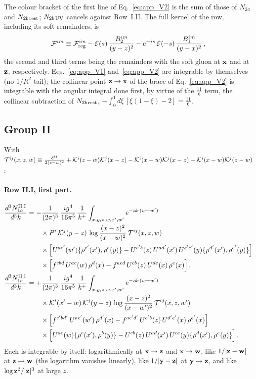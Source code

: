 The colour bracket of the first line of Eq.~\eqref{eq:app_V2} is the sum of those of $N_{2a}$ and $N_{2b\,\rm rest}$; $N_{2b\,\rm UV}$ cancels against Row~I.II. The full kernel of the row, including its soft remainders, is
\begin{align}\label{eq:app_F}
\mathcal F^{im}\equiv\mathcal F^{im}_{\rm reg}-\mathcal E(s)\,\frac{B_2^{im}}{(y-z)^2}-e^{-is}\,\mathcal E(-s)\,\frac{B_1^{im}}{(y-x)^2}\,,
\end{align}
the second and third terms being the remainders with the soft gluon at $\mathbf{x}$ and at $\mathbf{z}$, respectively. Eqs.~\eqref{eq:app_V1} and~\eqref{eq:app_V2} are integrable by themselves (no $1/R^2$ tail); the collinear point $\mathbf{z}\to\mathbf{x}$ of the brace of Eq.~\eqref{eq:app_V2} is integrable with the angular integral done first, by virtue of the $\frac{11}{6}$ term, the collinear subtraction of $N_{2b\,\rm rest}$, $-\int_0^1d\xi\,[\xi(1-\xi)-2]=\frac{11}{6}$.

\subsection{Group II}

With $\mathcal T^{ij}(x,z,w)\equiv\frac{\delta^{ij}}{2(z-w)^2}+\mathcal{K}^i(z-w)\mathcal{K}^j(x-z)-\mathcal{K}^i(x-w)\mathcal{K}^j(x-z)-\mathcal{K}^i(x-w)\mathcal{K}^j(z-w)$:

\paragraph{Row II.I, first part.}
\begin{align}\label{eq:app_III1a}
\frac{d^3N^{\rm II.I}_{1a}}{d^3k}&=-\frac{1}{(2\pi)^3}\,\frac{ig^4}{16\pi^5}\,\frac{1}{k^+}\int_{x,y,z,w,x',w'}e^{-ik\cdot(w-w')}\notag\\&\qquad\times P^i\,\mathcal{K}^j(y-z)\,\log\frac{(x-z)^2}{(x-w)^2}\,\mathcal T^{ij}(x,z,w)\notag\\
&\qquad\times\Big[U^{ac'}(w')\{\rho^{c'}(x'),\rho^b(y)\}-U^{c'b}(z)\,U^{ad'}(x')\,U^{c'e'}(y)\{\rho^{d'}(x'),\rho^{e'}(y)\}\Big]\notag\\
&\qquad\times\Big[f^{cbd}\,U^{ac}(w)\,\rho^d(x)-f^{acd}\,U^{cb}(z)\,U^{de}(x)\,\rho^e(x)\Big]\,,\\
\label{eq:app_III1b}
\frac{d^3N^{\rm II.I}_{1b}}{d^3k}&=+\frac{1}{(2\pi)^3}\,\frac{ig^4}{16\pi^5}\,\frac{1}{k^+}\int_{x,y,z,w,x',w'}e^{-ik\cdot(w-w')}\notag\\&\qquad\times\mathcal{K}^i(x'-w)\,\mathcal{K}^j(y-z)\,\log\frac{(x-z)^2}{(x-w')^2}\,\mathcal T^{ij}(x,z,w')\notag\\
&\qquad\times\Big[f^{c'bd'}\,U^{ac'}(w')\,\rho^{d'}(x)-f^{ac'd'}\,U^{c'b}(z)\,U^{d'e'}(x)\,\rho^{e'}(x)\Big]\notag\\
&\qquad\times\Big[U^{ac}(w)\{\rho^c(x'),\rho^b(y)\}-U^{cb}(z)\,U^{ad}(x')\,U^{ce}(y)\{\rho^d(x'),\rho^e(y)\}\Big]\,.
\end{align}
Each is integrable by itself: logarithmically at $\mathbf{x}\to\mathbf{z}$ and $\mathbf{x}\to\mathbf{w}$, like $1/|\mathbf{z}-\mathbf{w}|$ at $\mathbf{z}\to\mathbf{w}$ (the logarithm vanishes linearly), like $1/|\mathbf{y}-\mathbf{z}|$ at $\mathbf{y}\to\mathbf{z}$, and like $\log\mathbf{z}^2/|\mathbf{z}|^3$ at large $z$.

